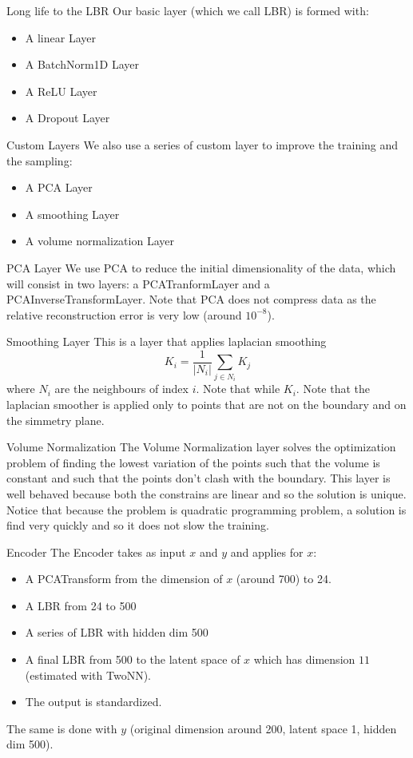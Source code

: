 \documentclass{beamer}
\begin{document}
\begin{frame}{Long life to the LBR}
Our basic layer (which we call LBR) is formed with:
\begin{itemize}
\item A linear Layer
\item A BatchNorm1D Layer
\item A ReLU Layer
\item A Dropout Layer
\end{itemize}
\end{frame}
\begin{frame}{Custom Layers}
We also use a series of custom layer to improve the training and the sampling:
\begin{itemize}
\item A PCA Layer
\item A smoothing Layer
\item A volume normalization Layer
\end{itemize}
\end{frame}
\begin{frame}{PCA Layer}
We use PCA to reduce the initial dimensionality of the data, which will consist in two layers: a PCATranformLayer and a PCAInverseTransformLayer. Note that PCA does not compress data as the relative reconstruction error is very low (around $10^{-8}$).
\end{frame}
\begin{frame}{Smoothing Layer}
This is a layer that applies laplacian smoothing $$K_{i}=\frac{1}{|N_{i}|}\sum_{j \in N_{i}} K_{j}$$ where $N_{i}$ are the neighbours of index $i$. Note that while $K_{i}$. Note that the laplacian smoother is applied only to points that are not on the boundary and on the simmetry plane. 
\end{frame}
\begin{frame}{Volume Normalization}
The Volume Normalization layer solves the optimization problem of finding the lowest variation of the points such that the volume is constant and such that the points don't clash with the boundary. This layer is well behaved because both the constrains are linear and so the solution is unique. Notice that because the problem is quadratic programming problem, a solution is find very quickly and so it does not slow the training.
\end{frame}
\begin{frame}{Encoder}
The Encoder takes as input $x$ and $y$ and applies for $x$:
\begin{itemize}
\item A PCATransform from the dimension of $x$ (around 700) to 24.
\item A LBR from 24 to 500
\item A series of LBR with hidden dim 500
\item A final LBR from 500 to the latent space of $x$ which has dimension $11$ (estimated with TwoNN). 
\item The output is standardized.
\end{itemize}
The same is done with $y$ (original dimension around 200,  latent space 1, hidden dim 500).
\end{frame}
\end{document}
